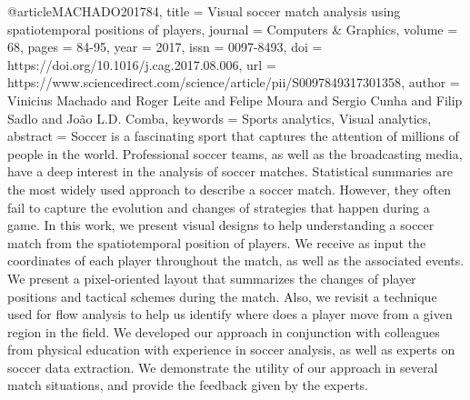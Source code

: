 @article{MACHADO201784,
title = {Visual soccer match analysis using spatiotemporal positions of players},
journal = {Computers & Graphics},
volume = {68},
pages = {84-95},
year = {2017},
issn = {0097-8493},
doi = {https://doi.org/10.1016/j.cag.2017.08.006},
url = {https://www.sciencedirect.com/science/article/pii/S0097849317301358},
author = {Vinicius Machado and Roger Leite and Felipe Moura and Sergio Cunha and Filip Sadlo and João L.D. Comba},
keywords = {Sports analytics, Visual analytics},
abstract = {Soccer is a fascinating sport that captures the attention of millions of people in the world. Professional soccer teams, as well as the broadcasting media, have a deep interest in the analysis of soccer matches. Statistical summaries are the most widely used approach to describe a soccer match. However, they often fail to capture the evolution and changes of strategies that happen during a game. In this work, we present visual designs to help understanding a soccer match from the spatiotemporal position of players. We receive as input the coordinates of each player throughout the match, as well as the associated events. We present a pixel-oriented layout that summarizes the changes of player positions and tactical schemes during the match. Also, we revisit a technique used for flow analysis to help us identify where does a player move from a given region in the field. We developed our approach in conjunction with colleagues from physical education with experience in soccer analysis, as well as experts on soccer data extraction. We demonstrate the utility of our approach in several match situations, and provide the feedback given by the experts.}
}